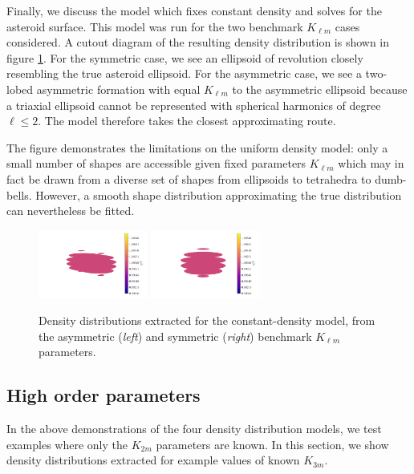 \documentclass{aastex631}
\begin{document}
Finally, we discuss the model which fixes constant density and solves for the asteroid surface. This model was run for the two benchmark $K_{\ell m}$ cases considered. A cutout diagram of the resulting density distribution is shown in figure \ref{fig:surface-density-distro}. For the symmetric case, we see an ellipsoid of revolution closely resembling the true asteroid ellipsoid. For the asymmetric case, we see a two-lobed asymmetric formation with equal $K_{\ell m}$ to the asymmetric ellipsoid because a triaxial ellipsoid cannot be represented with spherical harmonics of degree $\ell \leq 2$. The model therefore takes the closest approximating route.

The figure demonstrates the limitations on the uniform density model: only a small number of shapes are accessible given fixed parameters $K_{\ell m}$ which may in fact be drawn from a diverse set of shapes from ellipsoids to tetrahedra to dumb-bells. However, a smooth shape distribution approximating the true distribution can nevertheless be fitted.

\begin{figure}
  \centering
  \includegraphics[width=0.32\textwidth]{surface-asym.pdf}
  \includegraphics[width=0.32\textwidth]{surface-sym.pdf}
  \caption{Density distributions extracted for the constant-density model, from the asymmetric (\textit{left}) and symmetric (\textit{right}) benchmark $K_{\ell m}$ parameters.}
  \label{fig:surface-density-distro}
\end{figure}


\subsection{High order parameters}
In the above demonstrations of the four density distribution models, we test examples where only the $K_{2m}$ parameters are known. In this section, we show density distributions extracted for example values of known $K_{3m}$.
\end{document}

